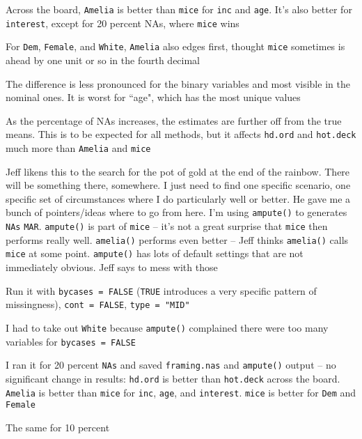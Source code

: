 \begin{coi}
\begin{coi}
				\item Across the board, \texttt{Amelia} is better than \texttt{mice} for \texttt{inc} and \texttt{age}. It's also better for \texttt{interest}, except for 20 percent NAs, where \texttt{mice} wins
				\item For \texttt{Dem}, \texttt{Female}, and \texttt{White}, \texttt{Amelia} also edges first, thought \texttt{mice} sometimes is ahead by one unit or so in the fourth decimal
				\item The difference is less pronounced for the binary variables and most visible in the nominal ones. It is worst for ``age", which has the most unique values
				\item As the percentage of NAs increases, the estimates are further off from the true means. This is to be expected for all methods, but it affects \texttt{hd.ord} and \texttt{hot.deck} much more than \texttt{Amelia} and \texttt{mice}
			\end{coi}
		\item Jeff likens this to the search for the pot of gold at the end of the rainbow. There will be something there, somewhere. I just need to find one specific scenario, one specific set of circumstances where I do particularly well or better. He gave me a bunch of pointers/ideas where to go from here. I'm using \texttt{ampute()} to generates \texttt{NAs} \texttt{MAR}. \texttt{ampute()} is part of \texttt{mice} -- it's not a great surprise that \texttt{mice} then performs really well. \texttt{amelia()} performs even better -- Jeff thinks \texttt{amelia()} calls \texttt{mice} at some point. \texttt{ampute()} has lots of default settings that are not immediately obvious. Jeff says to mess with those
		\item Run it with \texttt{bycases = FALSE} (\texttt{TRUE} introduces a very specific pattern of missingness), \texttt{cont = FALSE}, \texttt{type = "MID"}
			\begin{coi}
				\item I had to take out \texttt{White} because \texttt{ampute()} complained there were too many variables for \texttt{bycases = FALSE}
				\item I ran it for 20 percent \texttt{NAs} and saved \texttt{framing.nas} and \texttt{ampute()} output -- no significant change in results: \texttt{hd.ord} is better than \texttt{hot.deck} across the board. \texttt{Amelia} is better than \texttt{mice} for \texttt{inc}, \texttt{age}, and \texttt{interest}. \texttt{mice} is better for \texttt{Dem} and \texttt{Female}
				\item The same for 10 percent

\end{coi}
\end{coi}
